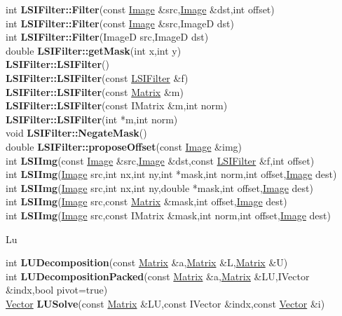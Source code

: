 \documentclass[10pt,titlepage]{article}
\def\functionlistentry#1#2#3#4#5#6{\noindent #1 {\bf #2}(#3) \dotfill #6\\}
\def\letterref#1{}
\def\letterlabel#1{\vspace{0.5cm}\centerline{\Large #1}}
\def\letterlabelend#1{}
\begin{document}
{{\letterref{La}
\letterref{Le}
\letterref{Li}
\letterref{Lm}
\letterref{Lo}
\letterref{Ls}
\letterref{Lu}
\letterlabelend{Ls}
\functionlistentry{int}{LSIFilter::Filter}{const \hyperlink{Image}{Image} \&src,\hyperlink{Image}{Image} \&dst,int offset}{330}{filter}{}
\functionlistentry{int}{LSIFilter::Filter}{const \hyperlink{Image}{Image} \&src,ImageD dst}{331}{filter}{}
\functionlistentry{int}{LSIFilter::Filter}{ImageD src,ImageD dst}{332}{filter}{}
\functionlistentry{double}{LSIFilter::getMask}{int x,int y}{323}{filter}{}
\functionlistentry{}{LSIFilter::LSIFilter}{}{318}{filter}{}
\functionlistentry{}{LSIFilter::LSIFilter}{const \hyperlink{LSIFilter}{LSIFilter} \&f}{319}{filter}{}
\functionlistentry{}{LSIFilter::LSIFilter}{const \hyperlink{Matrix}{Matrix} \&m}{320}{filter}{}
\functionlistentry{}{LSIFilter::LSIFilter}{const IMatrix \&m,int norm}{321}{filter}{}
\functionlistentry{}{LSIFilter::LSIFilter}{int *m,int norm}{322}{filter}{}
\functionlistentry{void}{LSIFilter::NegateMask}{}{324}{filter}{}
\functionlistentry{double}{LSIFilter::proposeOffset}{const \hyperlink{Image}{Image} \&img}{325}{filter}{}
\functionlistentry{int}{LSIImg}{const \hyperlink{Image}{Image} \&src,\hyperlink{Image}{Image} \&dst,const \hyperlink{LSIFilter}{LSIFilter} \&f,int offset}{333}{filter}{}
\functionlistentry{int}{LSIImg}{\hyperlink{Image}{Image} src,int nx,int ny,int *mask,int norm,int offset,\hyperlink{Image}{Image} dest}{334}{filter}{}
\functionlistentry{int}{LSIImg}{\hyperlink{Image}{Image} src,int nx,int ny,double *mask,int offset,\hyperlink{Image}{Image} dest}{335}{filter}{}
\functionlistentry{int}{LSIImg}{\hyperlink{Image}{Image} src,const \hyperlink{Matrix}{Matrix} \&mask,int offset,\hyperlink{Image}{Image} dest}{336}{filter}{}
\functionlistentry{int}{LSIImg}{\hyperlink{Image}{Image} src,const IMatrix \&mask,int norm,int offset,\hyperlink{Image}{Image} dest}{337}{filter}{}

\letterlabel{Lu}
\letterref{A}
\letterref{B}
\letterref{C}
\letterref{D}
\letterref{E}
\letterref{F}
\letterref{G}
\letterref{H}
\letterref{I}
\letterref{K}
\letterref{L}
\letterref{M}
\letterref{N}
\letterref{O}
\letterref{P}
\letterref{Q}
\letterref{R}
\letterref{S}
\letterref{T}
\letterref{U}
\letterref{V}
\letterref{W}
\letterref{X}
\letterref{Y}
\letterref{Z}

\letterref{La}
\letterref{Le}
\letterref{Li}
\letterref{Lm}
\letterref{Lo}
\letterref{Ls}
\letterref{Lu}
\letterlabelend{Lu}
\functionlistentry{int}{LUDecomposition}{const \hyperlink{Matrix}{Matrix} \&a,\hyperlink{Matrix}{Matrix} \&L,\hyperlink{Matrix}{Matrix} \&U}{1121}{matrixAlgebra}{}
\functionlistentry{int}{LUDecompositionPacked}{const \hyperlink{Matrix}{Matrix} \&a,\hyperlink{Matrix}{Matrix} \&LU,IVector \&indx,bool pivot=true}{1122}{matrixAlgebra}{}
\functionlistentry{\hyperlink{Vector}{Vector}}{LUSolve}{const \hyperlink{Matrix}{Matrix} \&LU,const IVector \&indx,const \hyperlink{Vector}{Vector} \&i}{1123}{matrixAlgebra}{}

}}
\end{document}
